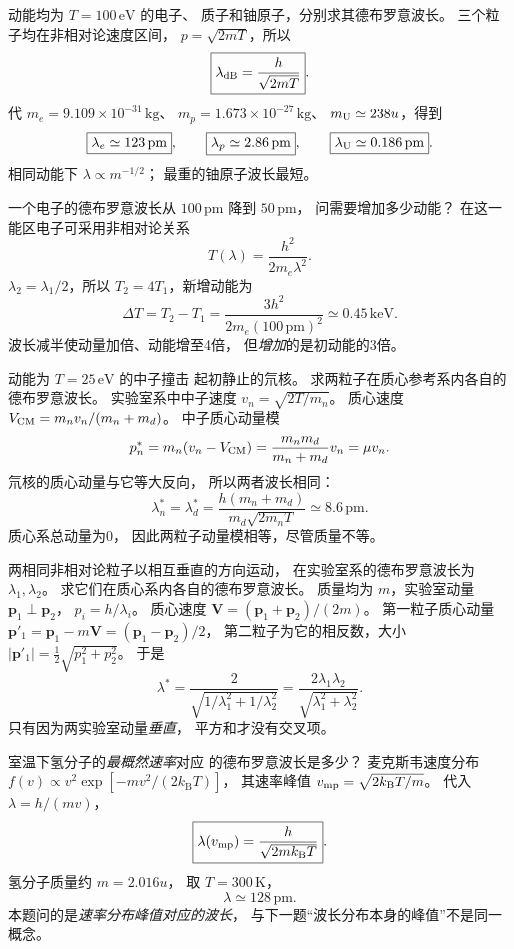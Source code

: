 动能均为 $T=100\,\mathrm{eV}$ 的电子、
质子和铀原子，分别求其德布罗意波长。
\exsolution
三个粒子均在非相对论速度区间，
$p=\sqrt{2mT}$，所以
\[
 \boxed{\lambda_{\rm dB}=\frac h{\sqrt{2mT}}}.
\]
代
$m_e=9.109\times10^{-31}\,\mathrm{kg}$、
$m_p=1.673\times10^{-27}\,\mathrm{kg}$、
$m_{\rm U}\simeq238u$，得到
\[
 \boxed{\lambda_e\simeq123\,\mathrm{pm}},\qquad
 \boxed{\lambda_p\simeq2.86\,\mathrm{pm}},\qquad
 \boxed{\lambda_{\rm U}\simeq0.186\,\mathrm{pm}}.
\]
\excheck 相同动能下 $\lambda\propto m^{-1/2}$；
最重的铀原子波长最短。

一个电子的德布罗意波长从
$100\,\mathrm{pm}$ 降到 $50\,\mathrm{pm}$，
问需要增加多少动能？
\exsolution
在这一能区电子可采用非相对论关系
\[
 T(\lambda)=\frac{h^2}{2m_e\lambda^2}.
\]
$\lambda_2=\lambda_1/2$，所以
$T_2=4T_1$，新增动能为
\[
 \boxed{\Delta T=T_2-T_1=
 \frac{3h^2}{2m_e(100\,\mathrm{pm})^2}
 \simeq0.45\,\mathrm{keV}}.
\]
\excheck 波长减半使动量加倍、动能增至4倍，
但\emph{增加}的是初动能的3倍。

动能为 $T=25\,\mathrm{eV}$ 的中子撞击
起初静止的氘核。
求两粒子在质心参考系内各自的德布罗意波长。
\exsolution
实验室系中中子速度
$v_n=\sqrt{2T/m_n}$。
质心速度
$V_{\rm CM}=m_nv_n/(m_n+m_d)$。
中子质心动量模
\[
 p_n^*=m_n(v_n-V_{\rm CM})
 =\frac{m_nm_d}{m_n+m_d}v_n=\mu v_n.
\]
氘核的质心动量与它等大反向，
所以两者波长相同：
\[
 \boxed{\lambda_n^*=\lambda_d^*=
 \frac{h(m_n+m_d)}
 {m_d\sqrt{2m_nT}}\simeq8.6\,\mathrm{pm}}.
\]
\excheck 质心系总动量为0，
因此两粒子动量模相等，尽管质量不等。

两相同非相对论粒子以相互垂直的方向运动，
在实验室系的德布罗意波长为
$\lambda_1,\lambda_2$。
求它们在质心系内各自的德布罗意波长。
\exsolution
质量均为 $m$，实验室动量
$\boldsymbol p_1\perp\boldsymbol p_2$，
$p_i=h/\lambda_i$。
质心速度
$\boldsymbol V=(\boldsymbol p_1+\boldsymbol p_2)/(2m)$。
第一粒子质心动量
$\boldsymbol p'_1=\boldsymbol p_1-m\boldsymbol V
=(\boldsymbol p_1-\boldsymbol p_2)/2$，
第二粒子为它的相反数，大小
$|\boldsymbol p'_1|=\tfrac12\sqrt{p_1^2+p_2^2}$。
于是
\[
 \boxed{\lambda^*=
 \frac{2}{\sqrt{1/\lambda_1^2+1/\lambda_2^2}}
 =\frac{2\lambda_1\lambda_2}
 {\sqrt{\lambda_1^2+\lambda_2^2}}}.
\]
\excheck 只有因为两实验室动量\emph{垂直}，
平方和才没有交叉项。

室温下氢分子的\emph{最概然速率}对应
的德布罗意波长是多少？
\exsolution
麦克斯韦速度分布
$f(v)\propto v^2\exp[-mv^2/(2k_{\mathrm B}T)]$，
其速率峰值
$v_{\rm mp}=\sqrt{2k_{\mathrm B}T/m}$。
代入 $\lambda=h/(mv)$，
\[
 \boxed{\lambda(v_{\rm mp})=
 \frac{h}{\sqrt{2mk_{\mathrm B}T}}}.
\]
氢分子质量约 $m=2.016u$，
取 $T=300\,\mathrm K$，
\[
 \boxed{\lambda\simeq128\,\mathrm{pm}}.
\]
\excheck 本题问的是\emph{速率分布峰值对应的波长}，
与下一题“波长分布本身的峰值”不是同一概念。


